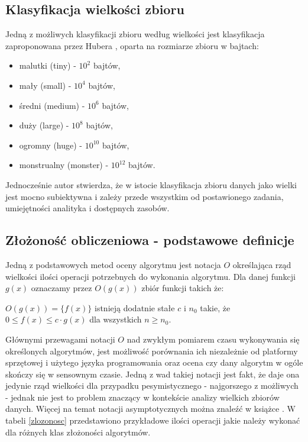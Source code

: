 \documentclass[man,mfu]{mgrwms}
\begin{document}
\subsection{Klasyfikacja wielkości zbioru}

Jedną z możliwych klasyfikacji zbioru według wielkości jest klasyfikacja zaproponowana przez Hubera \cite{Huber2011}, oparta na rozmiarze zbioru w bajtach:

\begin{itemize}
\item malutki (tiny) - $10^2$ bajtów,
\item mały (small) - $10^4$ bajtów,
\item średni (medium) - $10^6$ bajtów,
\item duży (large) - $10^8$ bajtów,
\item ogromny (huge) - $10^{10}$ bajtów,
\item monstrualny (monster) - $10^{12}$ bajtów.
\end{itemize}

Jednocześnie autor stwierdza, że w istocie klasyfikacja zbioru danych jako wielki jest mocno subiektywna i zależy przede wszystkim od postawionego zadania, umiejętności analityka i dostępnych zasobów.

\subsection{Złożoność obliczeniowa - podstawowe definicje}

Jedną z podstawowych metod oceny algorytmu jest notacja $O$ określająca rząd wielkości ilości operacji potrzebnych do wykonania algorytmu. Dla danej funkcji $g(x)$ oznaczamy przez $O(g(x))$ zbiór funkcji takich że:

$O(g(x)) = \{ f(x)\} $ istnieją dodatnie stałe $c$ i $n_0$ takie, że $0 \leq f(x) \leq c \cdot g(x)$ dla wszystkich $n \geq n_0$. 


Głównymi przewagami notacji $O$ nad zwykłym pomiarem czasu wykonywania się określonych algorytmów, jest możliwość porównania ich niezależnie od platformy sprzętowej i użytego języka programowania oraz ocena czy dany algorytm w ogóle skończy się w sensownym czasie. Jedną z wad takiej notacji jest fakt, że daje ona jedynie rząd wielkości dla przypadku pesymistycznego - najgorszego z możliwych - jednak nie jest to problem znaczący w kontekście analizy wielkich zbiorów danych. Więcej na temat notacji asymptotycznych można znaleźć w książce \cite{Cormen}. W  tabeli \ref{zlozonosc} przedstawiono przykładowe ilości operacji jakie należy wykonać dla różnych klas złożoności algorytmów.
\end{document}
